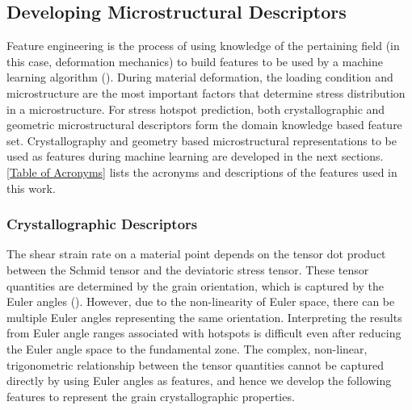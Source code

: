 \documentclass[preprint,1p,times,authoryear]{elsarticle}%
\begin{document}
\subsection{Developing Microstructural Descriptors}
Feature engineering is the process of using knowledge of the pertaining field (in this case, deformation mechanics) to build features to be used by a machine learning algorithm (\cite{Domingos2012}). During material deformation, the loading condition and microstructure are the most important factors that determine stress distribution in a microstructure. For stress hotspot prediction, both crystallographic and geometric microstructural descriptors form the domain knowledge based feature set.  Crystallography and geometry based microstructural representations to be used as features during machine learning are developed in the next sections. \ref{Table of Acronyms} lists the acronyms and descriptions of the features used in this work.

\subsubsection{Crystallographic Descriptors}
The shear strain rate on a material point depends on the tensor dot product between the Schmid tensor and the deviatoric stress tensor. These tensor quantities are determined by the grain orientation, which is captured by the Euler angles (\cite{KocksTomeWenk, Piehler2009}). However, due to the non-linearity of Euler space, there can be multiple Euler angles representing the same orientation. Interpreting the results from Euler angle ranges associated with hotspots is difficult even after reducing the Euler angle space to the fundamental zone. The complex, non-linear, trigonometric relationship between the tensor quantities cannot be captured directly by using Euler angles as features, and hence we develop the following features to represent the grain crystallographic properties.
\end{document}
